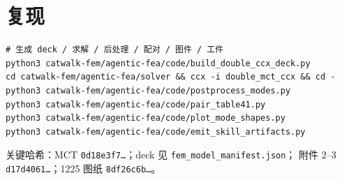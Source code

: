 \documentclass[11pt,a4paper]{ctexart}
\begin{document}
\appendix
\section{复现}

\begin{verbatim}
# 生成 deck / 求解 / 后处理 / 配对 / 图件 / 工件
python3 catwalk-fem/agentic-fea/code/build_double_ccx_deck.py
cd catwalk-fem/agentic-fea/solver && ccx -i double_mct_ccx && cd -
python3 catwalk-fem/agentic-fea/code/postprocess_modes.py
python3 catwalk-fem/agentic-fea/code/pair_table41.py
python3 catwalk-fem/agentic-fea/code/plot_mode_shapes.py
python3 catwalk-fem/agentic-fea/code/emit_skill_artifacts.py
\end{verbatim}

关键哈希：MCT \texttt{0d18e3f7\ldots}；deck 见 \texttt{fem\_model\_manifest.json}；
附件 2--3 \texttt{d17d4061\ldots}；1225 图纸 \texttt{8df26c6b\ldots}。
\end{document}
